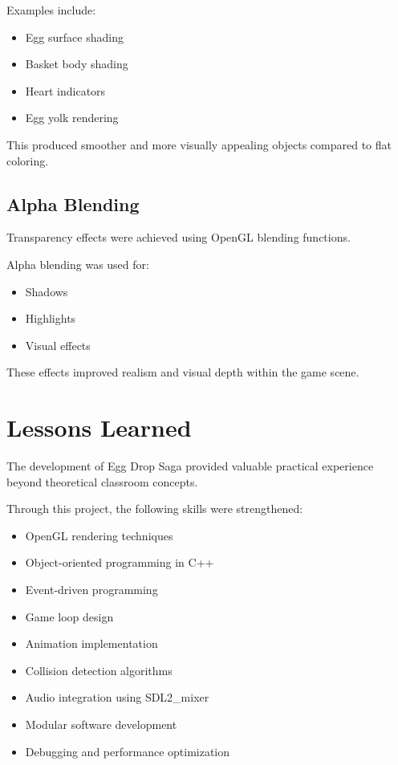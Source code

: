 \documentclass[12pt,a4paper]{report}
\begin{document}
Examples include:

\begin{itemize}
\item Egg surface shading
\item Basket body shading
\item Heart indicators
\item Egg yolk rendering
\end{itemize}

This produced smoother and more visually appealing objects compared to flat coloring.

\subsection*{Alpha Blending}

Transparency effects were achieved using OpenGL blending functions.

Alpha blending was used for:

\begin{itemize}
\item Shadows
\item Highlights
\item Visual effects
\end{itemize}

These effects improved realism and visual depth within the game scene.

\section{Lessons Learned}

The development of Egg Drop Saga provided valuable practical experience beyond theoretical classroom concepts.

Through this project, the following skills were strengthened:

\begin{itemize}
\item OpenGL rendering techniques
\item Object-oriented programming in C++
\item Event-driven programming
\item Game loop design
\item Animation implementation
\item Collision detection algorithms
\item Audio integration using SDL2\_mixer
\item Modular software development
\item Debugging and performance optimization
\end{itemize}
\end{document}
